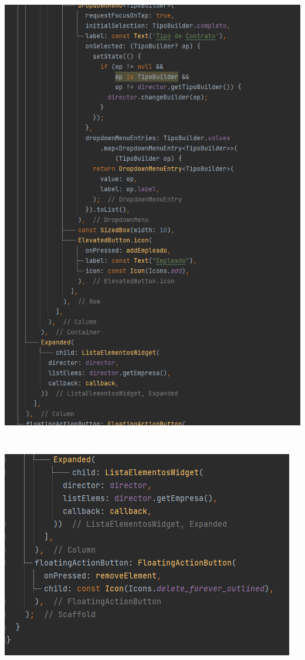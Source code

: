 \documentclass[
]{article}
\begin{document}
\includegraphics[width=5.90522in,height=8.40278in]{imagenes/main6.png}
\pagebreak
\includegraphics[]{imagenes/main7.png}
\end{document}
